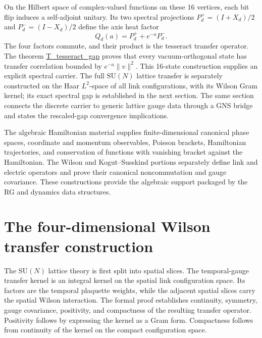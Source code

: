 \documentclass[11pt]{article}
\numberwithin{equation}{section}
\newcommand{\SU}{\mathrm{SU}}
\newcommand{\Lean}[1]{\url{#1}}
\begin{document}
On the Hilbert space of complex-valued functions on these 16 vertices, each bit flip induces a self-adjoint unitary. Its two spectral projections \(P_d^+=(I+X_d)/2\) and \(P_d^-=(I-X_d)/2\) define the axis heat factor
\[
  Q_d(a)=P_d^+ + e^{-a}P_d^-.
\]
The four factors commute, and their product is the tesseract transfer operator. The theorem \Lean{T_tesseract_gap} proves that every vacuum-orthogonal state has transfer correlation bounded by \(e^{-a}\|v\|^2\). This 16-state construction supplies an explicit spectral carrier. The full \(\SU(N)\) lattice transfer is separately constructed on the Haar \(L^2\)-space of all link configurations, with its Wilson Gram kernel; its exact spectral gap is established in the next section. The same section connects the discrete carrier to generic lattice gauge data through a GNS bridge and states the rescaled-gap convergence implications.

The algebraic Hamiltonian material supplies finite-dimensional canonical phase spaces, coordinate and momentum observables, Poisson brackets, Hamiltonian trajectories, and conservation of functions with vanishing bracket against the Hamiltonian. The Wilson and Kogut--Susskind portions separately define link and electric operators and prove their canonical noncommutation and gauge covariance. These constructions provide the algebraic support packaged by the RG and dynamics data structures.

\section{The four-dimensional Wilson transfer construction}

The \(\SU(N)\) lattice theory is first split into spatial slices. The temporal-gauge transfer kernel is an integral kernel on the spatial link configuration space. Its factors are the temporal plaquette weights, while the adjacent spatial slices carry the spatial Wilson interaction. The formal proof establishes continuity, symmetry, gauge covariance, positivity, and compactness of the resulting transfer operator. Positivity follows by expressing the kernel as a Gram form. Compactness follows from continuity of the kernel on the compact configuration space.
\end{document}
